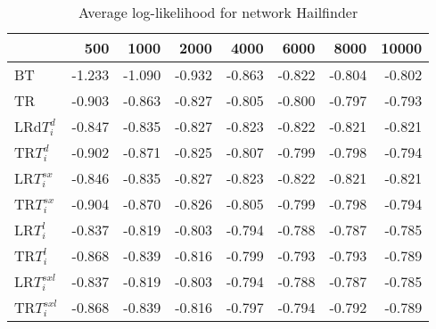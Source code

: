 \begin{table}
 \begin{center}
 \begin{tabular}{lrrrrrrr}
& 500 &  1000 & 2000 & 4000 & 6000& 8000&  10000\\\hline
BT & -1.233 & -1.090 & -0.932 & -0.863 & -0.822 & -0.804 & -0.802\\\hline
TR & -0.903 & -0.863 & -0.827 & -0.805 & -0.800 & -0.797 & -0.793\\\hline
LRd$T_i^d$ & -0.847 & -0.835 & -0.827 & -0.823 & -0.822 & -0.821 & -0.821\\\hline
TR$T_i^d$ & -0.902 & -0.871 & -0.825 & -0.807 & -0.799 & -0.798 & -0.794\\\hline
LR$T_i^{sx}$ & -0.846 & -0.835 & -0.827 & -0.823 & -0.822 & -0.821 & -0.821\\\hline
TR$T_i^{sx}$ & -0.904 & -0.870 & -0.826 & -0.805 & -0.799 & -0.798 & -0.794\\\hline
LR$T_i^l$ & -0.837 & -0.819 & -0.803 & -0.794 & -0.788 & -0.787 & -0.785\\\hline
TR$T_i^l$ & -0.868 & -0.839 & -0.816 & -0.799 & -0.793 & -0.793 & -0.789\\\hline
LR$T_i^{sxl}$ & -0.837 & -0.819 & -0.803 & -0.794 & -0.788 & -0.787 & -0.785\\\hline
TR$T_i^{sxl}$ & -0.868 & -0.839 & -0.816 & -0.797 & -0.794 & -0.792 & -0.789\\\hline
\end{tabular}
\end{center}
\caption{Average log-likelihood for network Hailfinder }
\label{Hailfinderll}
\end{table}


